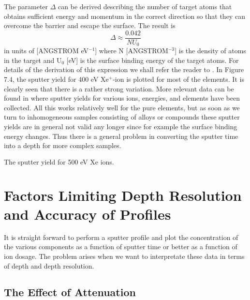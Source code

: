  The parameter $\Delta$ can be derived describing the
 number of target atoms that obtains sufficient energy and
 momentum in the correct direction so that they can overcome
 the barrier and escape the surface. The result is
 \begin{equation}
 \Delta \approx \frac{0.042}{NU_{0}}
 \end{equation}
 in units of [ANGSTROM eV$^{-1}$] where N [ANGSTROM$^{-3}$] is the density of atoms in
 the target and U$_{0}$ [eV] is the surface binding energy of
 the target atoms. For details of the derivation of this
 expression we shall refer the reader to \cite{sigmund}. In
 Figure 7.4, the sputter yield for 400 eV Xe$^{+}$-ion is
 plotted for most of the elements. It is clearly seen that
 there is a rather strong variation. More relevant data can
 be found in \cite{behrisch} where sputter yields for
 various ions, energies, and elements have been collected. All
 this works relatively well for the pure elements, but as
 soon as we turn to inhomogeneous samples consisting of
 alloys or compounds these sputter yields are in general not
 valid any longer since for example the surface binding
 energy changes. Thus there is a general problem in
 converting the sputter time into a depth for more complex
 samples.

 \newpage

\vspace*{11cm}

 The sputter yield for 500 eV Xe ions.\\


 \section{Factors Limiting Depth Resolution and Accuracy
 of Profiles}


 It is straight forward to perform a sputter profile and
 plot the concentration of the various components as a
 function of sputter time or better as a function of ion
 dosage. The problem arises when we want to interpretate
 these data in terms of depth and depth resolution.

 \subsection{The Effect of Attenuation}


